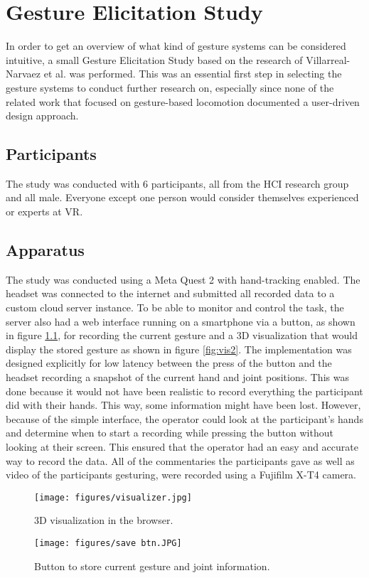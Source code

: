 \chapter{Gesture Elicitation Study}
In order to get an overview of what kind of gesture systems can be considered intuitive, a small Gesture Elicitation Study based on the research of Villarreal-Narvaez et al. \cite{elicitation} was performed. This was an essential first step in selecting the gesture systems to conduct further research on, especially since none of the related work that focused on gesture-based locomotion documented a user-driven design approach.

\section{Participants}
The study was conducted with 6 participants, all from the HCI research group and all male. Everyone except one person would consider themselves experienced or experts at VR.

\section{Apparatus}
The study was conducted using a Meta Quest 2 with hand-tracking enabled. The headset was connected to the internet and submitted all recorded data to a custom cloud server instance. To be able to monitor and control the task, the server also had a web interface running on a smartphone via a button, as shown in figure \ref{fig:savebtn}, for recording the current gesture and a 3D visualization that would display the stored gesture as shown in figure \ref{fig:vis2}. The implementation was designed explicitly for low latency between the press of the button and the headset recording a snapshot of the current hand and joint positions. This was done because it would not have been realistic to record everything the participant did with their hands. This way, some information might have been lost. However, because of the simple interface, the operator could look at the participant's hands and determine when to start a recording while pressing the button without looking at their screen. This ensured that the operator had an easy and accurate way to record the data. All of the commentaries the participants gave as well as video of the participants gesturing, were recorded using a Fujifilm X-T4 camera. 

\begin{figure}[!htb]
        \texttt{[image: figures/visualizer.jpg]}
        \caption{3D visualization in the browser.}
        \label{fig:vis2}
    \endminipage\hfill
        \texttt{[image: figures/save btn.JPG]}
        \caption{Button to store current gesture and joint information.}
        \label{fig:savebtn}
    \endminipage\hfill
\end{figure}

